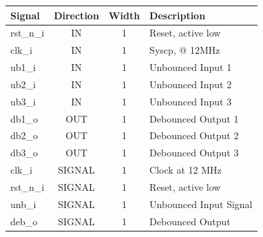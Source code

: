 \documentclass[12pt,a4 paper] {report}
\begin{document}
\begin{center}
	\begin{tabular}{ | p{2cm} | c | c | p{5cm} |}
		\hline
		\textbf{Signal} & \textbf{Direction} & \textbf{Width} & \textbf{Description} \\
		\hline
	  rst\_n\_i & IN & 1 & Reset, active low \\
	  \hline
		clk\_i & IN & 1 & Syscp, @ 12MHz \\
		\hline
		ub1\_i & IN & 1 & Unbounced Input 1 \\
		\hline
		ub2\_i & IN & 1 & Unbounced Input 2 \\
		\hline
		ub3\_i & IN & 1 & Unbounced Input 3 \\
		\hline
		db1\_o & OUT & 1 & Debounced Output 1 \\
		\hline
		db2\_o & OUT & 1 & Debounced Output 2 \\
		\hline
		db3\_o & OUT & 1 & Debounced Output 3 \\
		\hline
		\hline
		clk\_i & SIGNAL & 1 & Clock at 12 MHz\\
		\hline
		rst\_n\_i & SIGNAL & 1 & Reset, active low\\
		\hline
		unb\_i & SIGNAL & 1 & Unbounced Input Signal\\
		\hline
		deb\_o & SIGNAL & 1 & Debounced Output\\
		\hline
	\end{tabular}
\end{center}

\newpage
\end{document}
